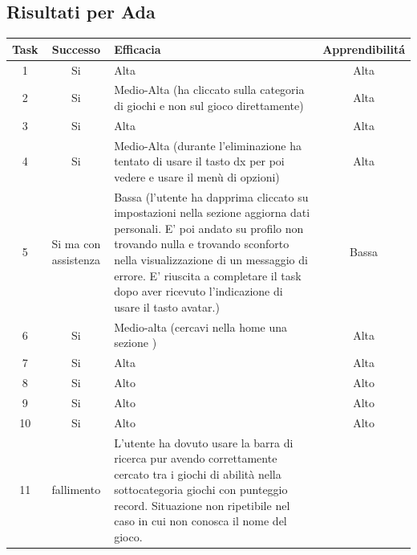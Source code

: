 \documentclass[../Report.tex]{subfiles}
\begin{document}
    \subsection{Risultati per Ada}
    \begin{table}[H]
        \begin{tabular}{|c|c|p{5cm}|c|}
            \hline
            Task & Successo & Efficacia & Apprendibilitá \\
            \hline
            1 & Si & Alta & Alta \\
            \hline
            2 & Si & Medio-Alta (ha cliccato sulla categoria di giochi e non sul gioco direttamente) & Alta \\
            \hline
            3 & Si & Alta & Alta \\
            \hline
            4 & Si & Medio-Alta (durante l'eliminazione ha tentato di usare il tasto dx per poi vedere e usare il menù di opzioni) & Alta \\
            \hline
            5 & Si ma con assistenza & Bassa (l’utente ha dapprima cliccato su impostazioni nella sezione aggiorna dati personali. E’ poi andato su profilo non trovando nulla e trovando sconforto nella visualizzazione di un messaggio di errore. E’ riuscita a completare il task dopo aver ricevuto l’indicazione di usare il tasto avatar.) & Bassa \\
            \hline
            6 & Si & Medio-alta (cercavi nella home una sezione ) & Alta \\
            \hline
            7 & Si & Alta & Alta \\
            \hline
            8 & Si & Alto & Alto \\
            \hline
            9 & Si & Alto & Alto \\
            \hline
            10 & Si & Alto & Alto \\
            \hline
            11 & fallimento & L’utente ha dovuto usare la barra di ricerca pur avendo correttamente cercato tra i giochi di abilità nella sottocategoria giochi con punteggio record. Situazione non ripetibile nel caso in cui non conosca il nome del gioco.  & \\
            \hline
        \end{tabular}
    \end{table}
\end{document}
